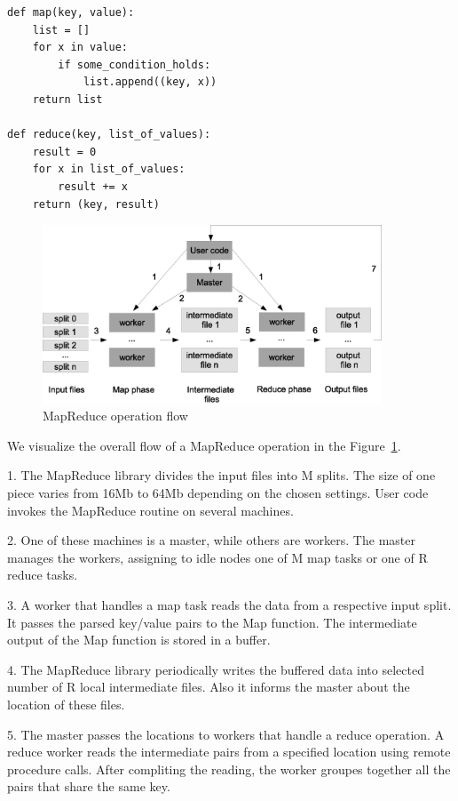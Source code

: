 \begin{lstlisting}
def map(key, value):
	list = []
	for x in value:
		if some_condition_holds:
	 		list.append((key, x))
	return list

def reduce(key, list_of_values):
	result = 0
	for x in list_of_values:
		result += x
	return (key, result)
\end{lstlisting}

\begin{figure}
  \centering
  \includegraphics [width=0.9\textwidth]{images/MapReduce_operation_flow}
  \caption{MapReduce operation flow}
  \label{fig:mapreduce_operation_flow}
\end{figure}

We visualize the overall flow of a MapReduce operation in the Figure~\ref{fig:mapreduce_operation_flow}.

1. The MapReduce library divides the input files into M splits.
The size of one piece varies from 16Mb to 64Mb depending on the chosen settings.
User code invokes the MapReduce routine on several machines.

2. One of these machines is a master, while others are workers.
The master manages the workers, assigning to idle nodes one of M map tasks or one of R reduce tasks.

3. A worker that handles a map task reads the data from a respective input split.
It passes the parsed key/value pairs to the Map function.
The intermediate output of the Map function is stored in a buffer.

4. The MapReduce library periodically writes the buffered data into selected number of R local intermediate files.
Also it informs the master about the location of these files.

5. The master passes the locations to workers that handle a reduce operation.
A reduce worker reads the intermediate pairs from a specified location using remote procedure calls.
After compliting the reading, the worker groupes together all the pairs that share the same key.

